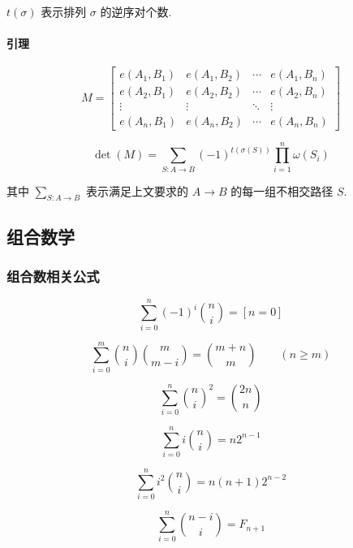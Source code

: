 \(t(\sigma)\) 表示排列 \(\sigma\) 的逆序对个数.

\paragraph{引理}

\[
    M = \begin{bmatrix}
        e(A_1,B_1) & e(A_1,B_2) & \cdots & e(A_1,B_n) \\
        e(A_2,B_1) & e(A_2,B_2) & \cdots & e(A_2,B_n) \\
        \vdots     & \vdots     & \ddots & \vdots     \\
        e(A_n,B_1) & e(A_n,B_2) & \cdots & e(A_n,B_n)
    \end{bmatrix}
\]

\[
    \det(M)=\sum\limits_{S:A\rightarrow B}(-1)^{t(\sigma(S))}\prod\limits_{i=1}^n \omega(S_i)
\]

其中 \(\sum\limits_{S:A\rightarrow B}\) 表示满足上文要求的 \(A\rightarrow B\) 的每一组不相交路径 \(S\).

\subsection{组合数学}

\subsubsection{组合数相关公式}

\begin{equation}
    \sum_{i=0}^n(-1)^i\binom{n}{i}=[n=0]
\end{equation}

\begin{equation}
    \sum_{i=0}^m \binom{n}{i}\binom{m}{m-i} = \binom{m+n}{m}\qquad(n \geq m)
\end{equation}

\begin{equation}
    \sum_{i=0}^n\binom{n}{i}^2=\binom{2n}{n}
\end{equation}

\begin{equation}
    \sum_{i=0}^ni\binom{n}{i}=n2^{n-1}
\end{equation}

\begin{equation}
    \sum_{i=0}^ni^2\binom{n}{i}=n(n+1)2^{n-2}
\end{equation}

\begin{equation}
    \sum_{i=0}^n\binom{n-i}{i}=F_{n+1}
\end{equation}

